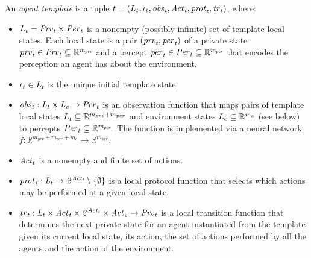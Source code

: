 \begin{definition}
An {\em agent template} is a tuple ${t} = \left ( L_{t}, \iota_{t}, \it{obs}_{t},
\mathit{Act}_{t}, \it{prot}_{t}, \it{tr}_{t}  \right )$, where:
\begin{itemize}[$\bullet$]
  \item $L_{t} = \it{Prv}_{t} \times \it{Per}_{t}$ is a nonempty (possibly infinite)
  set of template local states.  Each local state  is a pair $\left ( \it{prv}_{t}, \it{per}_{t} \right )$ of
  a private state $\it{prv}_{t} \in \it{Prv}_{t} \subseteq \mathbb R^{m_{prv}}$ and a
  percept $\it{per}_{t} \in \it{Per}_{t} \subseteq \mathbb R^{m_{per}}$ that encodes the
  perception an agent has about the environment.  

  \item $\iota_{t} \in L_{t}$ is the unique initial template state.
  
  \item $\it{obs}_{t} : L_{t} \times L_{e} \rightarrow \it{Per}_{t}$ is an
  observation function that maps pairs of template local states $L_{t}
  \subseteq \mathbb{R}^{m_{prv} + m_{per}}$ and environment states $L_{e}
  \subseteq \mathbb{R}^{m_e}$ (see below) to percepts $\it{Per}_{t} \subseteq
  \mathbb{R}^{m_{per}}$. The function is implemented via a neural
  network $f : \mathbb{R}^{m_{prv} + m_{per} + m_e} \rightarrow
  \mathbb{R}^{m_{per}}$.

  \item $\mathit{Act}_{t}$ is a nonempty and finite set of actions.
  
  \item $\it{prot}_{t} : L_{t} \rightarrow 2^{\mathit{Act}_{t}} \setminus \left \{ \emptyset \right \}$
  is a local protocol function that selects which actions may be performed at a
  given local state.%

  \item $\it{tr}_{t}: L_{t} \times \mathit{Act}_{t} \times 2^{\mathit{Act}_{t}} \times \mathit{Act}_{e} 
  \rightarrow \it{Prv}_{t}$ is a local transition function  that determines the next
  private state for an agent instantiated from the template given its current local state, its action, 
  the set of actions performed by all the agents  and the action of the
  environment.
  
\end{itemize}  
\end{definition}


